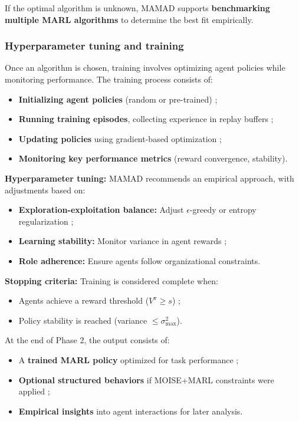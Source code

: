\documentclass[pdflatex,sn-mathphys-num]{sn-jnl}%
\theoremstyle{thmstyleone}%
\theoremstyle{thmstyletwo}%
\theoremstyle{thmstylethree}%
\begin{document}
\noindent If the optimal algorithm is unknown, MAMAD supports \textbf{benchmarking multiple MARL algorithms} to determine the best fit empirically.

\subsubsection{Hyperparameter tuning and training}
Once an algorithm is chosen, training involves optimizing agent policies while monitoring performance. The training process consists of:
\begin{itemize}
    \item \textbf{Initializing agent policies} (random or pre-trained) ;
    \item \textbf{Running training episodes}, collecting experience in replay buffers ;
    \item \textbf{Updating policies} using gradient-based optimization ;
    \item \textbf{Monitoring key performance metrics} (reward convergence, stability).
\end{itemize}

\noindent \textbf{Hyperparameter tuning:}
MAMAD recommends an empirical approach, with adjustments based on:
\begin{itemize}
    \item \textbf{Exploration-exploitation balance:} Adjust $\epsilon$-greedy or entropy regularization ;
    \item \textbf{Learning stability:} Monitor variance in agent rewards ;
    \item \textbf{Role adherence:} Ensure agents follow organizational constraints.
\end{itemize}

\noindent \textbf{Stopping criteria:}
Training is considered complete when:
\begin{itemize}
    \item Agents achieve a reward threshold ($V^{\pi} \geq s$) ;
    \item Policy stability is reached (variance $\leq \sigma_{\max}^2$).
\end{itemize}

At the end of Phase 2, the output consists of:
\begin{itemize}
    \item A \textbf{trained MARL policy} optimized for task performance ;
    \item \textbf{Optional structured behaviors} if MOISE+MARL constraints were applied ;
    \item \textbf{Empirical insights} into agent interactions for later analysis.
\end{itemize}
\end{document}
